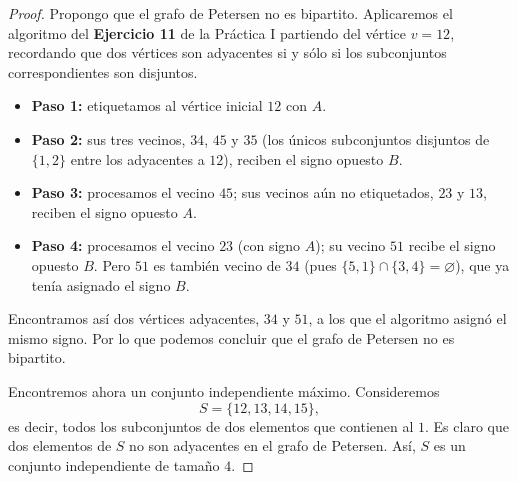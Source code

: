 \begin{proof}
    Propongo que el grafo de Petersen no es bipartito. Aplicaremos el algoritmo del \textbf{Ejercicio 11} de la Práctica I partiendo del vértice \( v = 12 \), recordando que dos vértices son adyacentes si y sólo si los subconjuntos correspondientes son disjuntos.

    \begin{center}
    \end{center}

    \begin{itemize}
        \item \textbf{Paso 1:} etiquetamos al vértice inicial \( 12 \) con \( A \).
        \item \textbf{Paso 2:} sus tres vecinos, \( 34 \), \( 45 \) y \( 35 \) (los únicos subconjuntos disjuntos de \( \{1,2\} \) entre los adyacentes a \( 12 \)), reciben el signo opuesto \( B \).
        \item \textbf{Paso 3:} procesamos el vecino \( 45 \); sus vecinos aún no etiquetados, \( 23 \) y \( 13 \), reciben el signo opuesto \( A \).
        \item \textbf{Paso 4:} procesamos el vecino \( 23 \) (con signo \( A \)); su vecino \( 51 \) recibe el signo opuesto \( B \). Pero \( 51 \) es también vecino de \( 34 \) (pues \( \{5,1\} \cap \{3,4\} = \varnothing \)), que ya tenía asignado el signo \( B \).
    \end{itemize}

    Encontramos así dos vértices adyacentes, \( 34 \) y \( 51 \), a los que el algoritmo asignó el mismo signo. Por lo que podemos concluir que el grafo de Petersen no es bipartito.

    \vspace{0.3cm}

    Encontremos ahora un conjunto independiente máximo. Consideremos
    \[
        S = \{12, 13, 14, 15\},
    \]
    es decir, todos los subconjuntos de dos elementos que contienen al \( 1 \). Es claro que dos elementos de \( S \) no son adyacentes en el grafo de Petersen. Así, \( S \) es un conjunto independiente de tamaño \( 4 \).


\end{proof}
